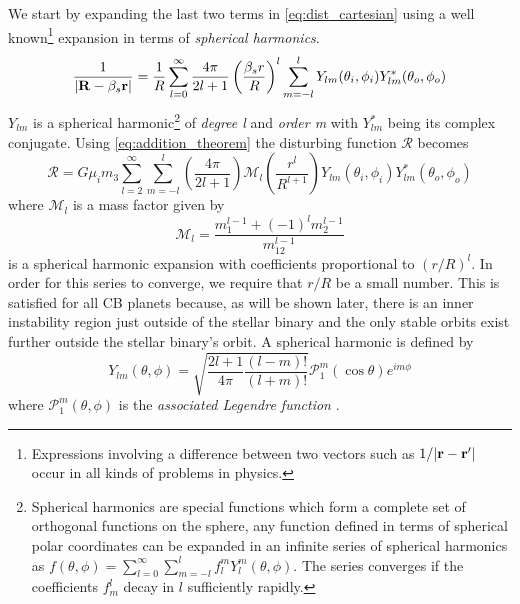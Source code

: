 \documentclass[twoside,openright,titlepage,numbers=noenddot,headinclude,%
                footinclude=true,cleardoublepage=empty,abstractoff, 
                BCOR=5mm,paper=a4,fontsize=11pt,%
                american,%
                ]{scrreprt}%
\begin{document}
We start by expanding the last two terms in \cref{eq:dist_cartesian} using 
a well known\footnote{Expressions involving a difference between two vectors 
such as $1/\lvert \boldsymbol{\mathbf{r}}-\boldsymbol{\mathbf{r}}'\rvert$ occur in all kinds of problems 
in physics.} expansion in terms of \emph{spherical harmonics}. 
\begin{equation}
    \frac{1}{\lvert \boldsymbol{\mathbf{R}} -\beta_s\boldsymbol{\mathbf{r}}\rvert}= \frac{1}{R} \sum^\infty_{l=0}
  \frac{4\pi}{2l+1}   \left( \frac{\beta_s r}{R} \right)^l
    \sum^l_{m=-l} Y_{lm}(\theta_i,\phi_i)
    Y_{lm}^*(\theta_o,\phi_o)
    \label{eq:addition_theorem}
\end{equation}
$Y_{lm}$ is a spherical harmonic\footnote{Spherical harmonics are special
functions which form a complete set of orthogonal functions on the sphere, 
any function defined in terms of spherical polar coordinates can be expanded
in an infinite series of spherical harmonics as $f(\theta,\phi)
=\sum^\infty_{l=0}\sum^l_{m=-l}f^m_lY_l^m(\theta,\phi)$. The series converges 
if the coefficients $f^l_m$ decay in $l$ sufficiently rapidly.} of
\emph{degree l} and \emph{order m} with
$Y_{lm}^*$ being its complex conjugate. Using 
\cref{eq:addition_theorem} the disturbing function $\mathcal{R}$ becomes
\begin{equation}
    \mathcal{R}=G\mu_im_3\sum^\infty_{l=2}\sum^l_{m=-l}\left( \frac{4\pi}{2l+1} 
    \right)\mathcal{M}_l\left( \frac{r^l}{R^{l+1}} \right) Y_{lm}(\theta_i,\phi_i)
    Y_{lm}^*(\theta_o,\phi_o)
\label{eq:dist_harmonics}
\end{equation}
where $\mathcal{M}_l$ is a mass factor given by
\begin{equation}
    \mathcal{M}_l= \frac{m_1^{l-1}+(-1)^lm_2^{l-1}}{m_{12}^{l-1}} 
\end{equation}
 is a spherical harmonic expansion with 
coefficients proportional to $(r/R)^l$. In order for this series
to converge, we require that $r/R$ be a small number. This is satisfied
for all CB planets because, as will be shown later, there is
an inner instability region just outside of the stellar binary and the only
stable orbits exist further outside the stellar binary's orbit. A spherical
harmonic is defined by
\begin{equation}
    Y_{lm}(\theta,\phi)=\sqrt{ \frac{2l+1}{4\pi} \frac{(l-m)!}{(l+m)!} }\mathcal{P}_1^m(
    \cos\theta)e^{im\phi}
    \label{eq:sph_harmonics}
\end{equation}
where $\mathcal{P}_1^m(\theta, \phi)$ is the \emph{associated Legendre function}
\citep{jackson}. 
\end{document}
